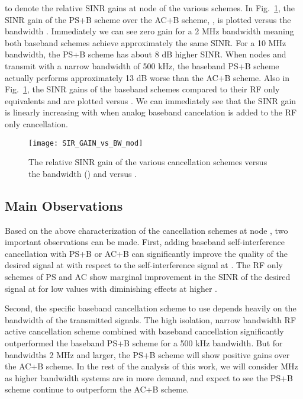 \documentclass[12pt, journal,draftcls,letterpaper,onecolumn]{IEEEtran}
\begin{document}
to denote the relative SINR gains at node  of the various schemes.  In Fig.~\ref{fig:SIR_GAIN}, the SINR gain of the PS+B scheme over the AC+B scheme, , is plotted versus the bandwidth .  Immediately we can see zero gain for a 2 MHz bandwidth meaning both baseband schemes achieve approximately the same SINR.  For a 10 MHz bandwidth, the PS+B scheme has about 8 dB higher SINR.  When nodes  and  transmit with a narrow bandwidth of 500 kHz, the baseband PS+B scheme actually performs approximately 13 dB worse than the AC+B scheme.  Also in Fig.~\ref{fig:SIR_GAIN}, the SINR gains of the baseband schemes compared to their RF only equivalents  and  are plotted versus .  We can immediately see that the SINR gain is linearly increasing with  when analog baseband cancelation is added to the RF only cancellation.  
\begin{figure}[htp]
\begin{center} 
  \texttt{[image: SIR\_GAIN\_vs\_BW\_mod]}
\caption[fig:chan_ang]{The relative SINR gain of the various cancellation schemes versus the bandwidth () and versus .} 
  \label{fig:SIR_GAIN}
\end{center} 
\end{figure}    


\subsection{Main Observations}
Based on the above characterization of the cancellation schemes at node , two important observations can be made.  First, adding baseband self-interference cancellation with PS+B or AC+B can significantly improve the quality of the desired signal at  with respect to the self-interference signal at .  The RF only schemes of PS and AC show marginal improvement in the SINR of the desired signal at  for low  values with diminishing effects at higher .  

Second, the specific baseband cancellation scheme to use depends heavily on the bandwidth of the transmitted signals.  The high isolation, narrow bandwidth RF active cancellation scheme combined with baseband cancellation significantly outperformed the baseband PS+B scheme for a 500 kHz bandwidth.  But for bandwidths 2 MHz and larger, the PS+B scheme will show positive gains over the AC+B scheme.  In the rest of the analysis of this work, we will consider  MHz  as higher bandwidth systems are in more demand, and expect to see the PS+B scheme continue to outperform the AC+B scheme.  
\end{document}
